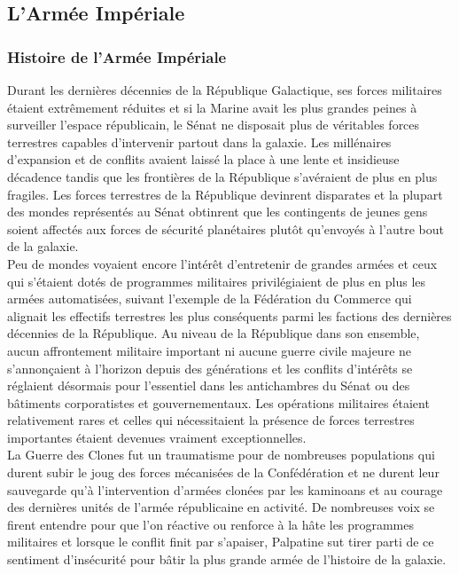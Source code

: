 \documentclass[twoside]{article}
\begin{document}
\subsection{L'Armée Impériale}
\subsubsection{Histoire de l'Armée Impériale}
Durant les dernières décennies de la République Galactique, ses forces militaires étaient extrêmement réduites et si la Marine avait les plus grandes peines à surveiller l'espace républicain, le Sénat ne disposait plus de véritables forces terrestres capables d'intervenir partout dans la galaxie. Les millénaires d'expansion et de conflits avaient laissé la place à une lente et insidieuse décadence tandis que les frontières de la République s'avéraient de plus en plus fragiles. Les forces terrestres de la République devinrent disparates et la plupart des mondes représentés au Sénat obtinrent que les contingents de jeunes gens soient affectés aux forces de sécurité planétaires plutôt qu'envoyés à l'autre bout de la galaxie.\\

Peu de mondes voyaient encore l'intérêt d'entretenir de grandes armées et ceux qui s'étaient dotés de programmes militaires privilégiaient de plus en plus les armées automatisées, suivant l'exemple de la Fédération du Commerce qui alignait les effectifs terrestres les plus conséquents parmi les factions des dernières décennies de la République. Au niveau de la République dans son ensemble, aucun affrontement militaire important ni aucune guerre civile majeure ne s'annonçaient à l'horizon depuis des générations et les conflits d'intérêts se réglaient désormais pour l'essentiel dans les antichambres du Sénat ou des bâtiments corporatistes et gouvernementaux. Les opérations militaires étaient relativement rares et celles qui nécessitaient la présence de forces terrestres importantes étaient devenues vraiment exceptionnelles.\\

La Guerre des Clones fut un traumatisme pour de nombreuses populations qui durent subir le joug des forces mécanisées de la Confédération et ne durent leur sauvegarde qu'à l'intervention d'armées clonées par les kaminoans et au courage des dernières unités de l'armée républicaine en activité. De nombreuses voix se firent entendre pour que l'on réactive ou renforce à la hâte les programmes militaires et lorsque le conflit finit par s'apaiser, Palpatine sut tirer parti de ce sentiment d'insécurité pour bâtir la plus grande armée de l'histoire de la galaxie.\\
\end{document}
